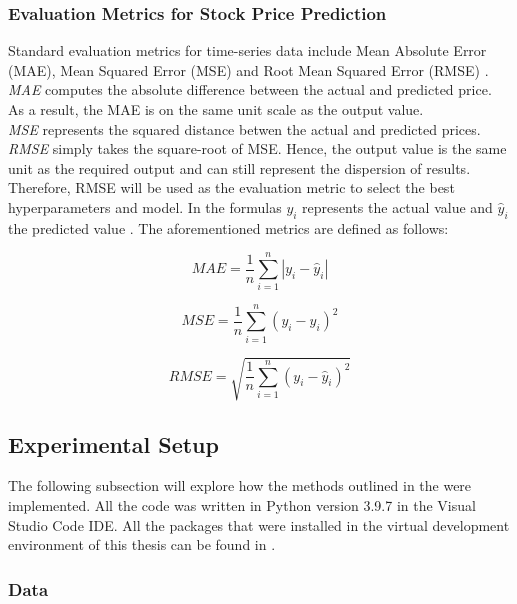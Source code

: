 \documentclass[11pt, a4paper]{article}
\begin{document}
\subsubsection{Evaluation Metrics for Stock Price Prediction}
Standard evaluation metrics for time-series data include Mean Absolute Error (MAE), Mean Squared Error (MSE) and Root Mean Squared Error (RMSE) \citep{rezaei2021stockpriceprediction}.\\
\emph{MAE} computes the absolute difference between the actual and predicted price. As a result, the MAE is on the same unit scale as
the output value.\\
\emph{MSE} represents the squared distance betwen the actual and predicted prices. \\
\emph{RMSE} simply takes the square-root of MSE. Hence, the output value is the same unit as the required output and can still represent the
dispersion of results. Therefore, RMSE will be used as the evaluation metric to select the best hyperparameters and model.
In the formulas $y_{i}$ represents the actual value and $\hat{y}_i$ the predicted value \citep{chen2021meanvariance}.
The aforementioned metrics are defined as follows:

\begin{equation*}
    MAE = \frac{1}{n}\sum_{i=1}^{n}|y_{i}-\hat{y}_{i}|
\end{equation*}

\begin{equation*}
    MSE = \frac{1}{n}\sum_{i=1}^{n}(y_{i}-\hat{y}_{i})^2
\end{equation*}

\begin{equation*}
    RMSE = \sqrt{\frac{1}{n}\sum_{i=1}^{n}(y_{i}-\hat{y}_{i})^2}
\end{equation*}


\subsection{Experimental Setup}
The following subsection will explore how the methods outlined in the  were implemented.
All the code was written in Python version 3.9.7 in the Visual Studio Code IDE. All the packages that were installed in the 
virtual development environment of this thesis can be found in .

\subsubsection{Data}
\end{document}

